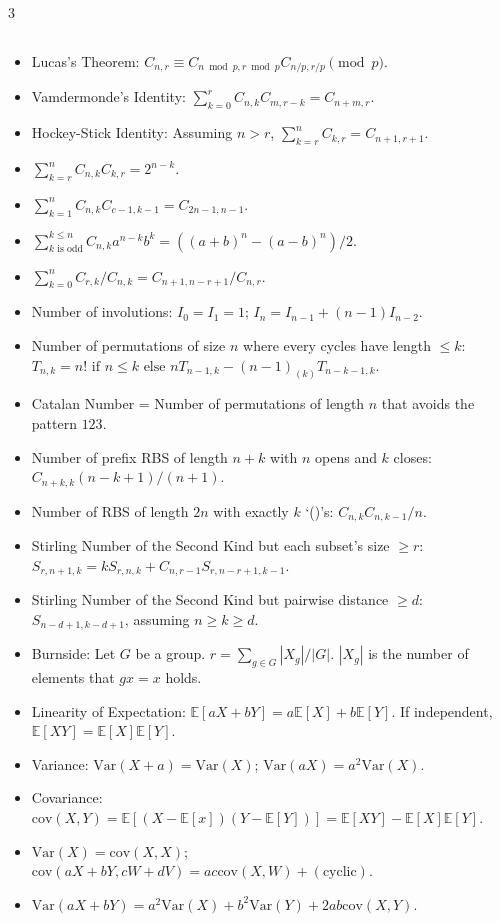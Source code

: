 \documentclass[landscape, 8pt, a4paper, oneside]{extarticle}
\begin{document}
\begin{multicols*}{3}
\subsection{}
\begin{itemize}
	\item Lucas's Theorem: $C_{n, r} \equiv C_{n \bmod p, r \bmod p} C_{n/p, r/p} \pmod p$.
	\item Vamdermonde's Identity: $\sum_{k=0}^{r} C_{n, k} C_{m, r-k} = C_{n+m, r}$.
	\item Hockey-Stick Identity: Assuming $n > r$, $\sum_{k=r}^{n} C_{k, r} = C_{n+1, r+1}$.
	\item $\sum_{k=r}^{n} C_{n, k} C_{k, r} = 2^{n-k}$.
	\item $\sum_{k=1}^{n} C_{n, k} C_{c-1, k-1} = C_{2n-1, n-1}$.
	\item $\sum_{k \text{ is odd}}^{k \le n} C_{n, k} a^{n-k} b^k = ((a+b)^n - (a-b)^n)/2$.
	\item $\sum_{k=0}^{n} C_{r, k} / C_{n, k} = C_{n+1, n-r+1} / C_{n, r}$.
	\item Number of involutions: $I_0 = I_1 = 1$; $I_{n} = I_{n-1} + (n-1) I_{n-2}$.
	\item Number of permutations of size $n$ where every cycles have length $\le k$: $T_{n,k} = n! \text{ if } n \le k \text{ else } n T_{n-1, k} - (n-1)_{(k)} T_{n-k-1, k}$.
	\item Catalan Number = Number of permutations of length $n$ that avoids the pattern $123$.
	\item Number of prefix RBS of length $n+k$ with $n$ opens and $k$ closes: $C_{n+k, k} (n-k+1)/(n+1)$.
	\item Number of RBS of length $2n$ with exactly $k$ `()'s: $C_{n, k} C_{n, k-1} / n$.
	\item Stirling Number of the Second Kind but each subset's size $\ge r$: \\ $S_{r, n+1, k} = k S_{r, n, k} + C_{n, r-1} S_{r, n-r+1, k-1}$.
	\item Stirling Number of the Second Kind but pairwise distance $\ge d$: $S_{n-d+1, k-d+1}$, assuming $n \ge k \ge d$.
	\item Burnside: Let $G$ be a group. $r = \sum_{g \in G} |X_g|/|G|$. $|X_g|$ is the number of elements that $gx = x$ holds.
	\item Linearity of Expectation: $\mathbb{E}[aX + bY] = a \mathbb{E}[X] + b \mathbb{E}[Y]$. If independent, $\mathbb{E}[XY] = \mathbb{E}[X] \mathbb{E}[Y]$.
	\item Variance: $\mathrm{Var}(X+a)= \mathrm{Var}(X)$; $\mathrm{Var}(aX) = a^2 \mathrm{Var}(X)$.
	\item Covariance: $\mathrm{cov}(X, Y) = \mathbb{E}[(X-\mathbb{E}[x])(Y-\mathbb{E}[Y])] = \mathbb{E}[XY] - \mathbb{E}[X] \mathbb{E}[Y]$.
	\item $\mathrm{Var}(X) = \mathrm{cov}(X, X)$; $\mathrm{cov}(aX + bY, cW + dV) = ac \mathrm{cov}(X, W) + (\text{cyclic})$.
	\item $\mathrm{Var}(aX + bY) = a^2 \mathrm{Var}(X) + b^2 \mathrm{Var}(Y) + 2ab \mathrm{cov}(X, Y)$.
\end{itemize}

\end{multicols*}
\end{document}
